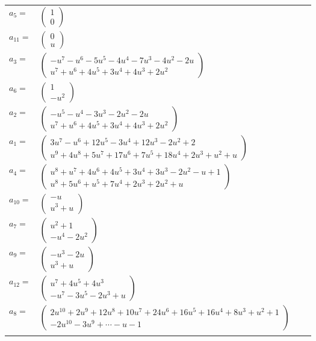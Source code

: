 \documentclass[1p]{elsarticle_modified}
\theoremstyle{definition}
\begin{document}
\begin{tabular}{m{7pt} m{180pt} m{7pt} m{180pt} }
\flushright $a_{5}=$&$\begin{pmatrix}1\\0\end{pmatrix}$ \\
\flushright $a_{11}=$&$\begin{pmatrix}0\\u\end{pmatrix}$ \\
\flushright $a_{3}=$&$\begin{pmatrix}- u^7- u^6-5 u^5-4 u^4-7 u^3-4 u^2-2 u\\u^7+u^6+4 u^5+3 u^4+4 u^3+2 u^2\end{pmatrix}$ \\
\flushright $a_{6}=$&$\begin{pmatrix}1\\- u^2\end{pmatrix}$ \\
\flushright $a_{2}=$&$\begin{pmatrix}- u^5- u^4-3 u^3-2 u^2-2 u\\u^7+u^6+4 u^5+3 u^4+4 u^3+2 u^2\end{pmatrix}$ \\
\flushright $a_{1}=$&$\begin{pmatrix}3 u^7- u^6+12 u^5-3 u^4+12 u^3-2 u^2+2\\u^9+4 u^8+5 u^7+17 u^6+7 u^5+18 u^4+2 u^3+u^2+u\end{pmatrix}$ \\
\flushright $a_{4}=$&$\begin{pmatrix}u^8+u^7+4 u^6+4 u^5+3 u^4+3 u^3-2 u^2- u+1\\u^8+5 u^6+u^5+7 u^4+2 u^3+2 u^2+u\end{pmatrix}$ \\
\flushright $a_{10}=$&$\begin{pmatrix}- u\\u^3+u\end{pmatrix}$ \\
\flushright $a_{7}=$&$\begin{pmatrix}u^2+1\\- u^4-2 u^2\end{pmatrix}$ \\
\flushright $a_{9}=$&$\begin{pmatrix}- u^3-2 u\\u^3+u\end{pmatrix}$ \\
\flushright $a_{12}=$&$\begin{pmatrix}u^7+4 u^5+4 u^3\\- u^7-3 u^5-2 u^3+u\end{pmatrix}$ \\
\flushright $a_{8}=$&$\begin{pmatrix}2 u^{10}+2 u^9+12 u^8+10 u^7+24 u^6+16 u^5+16 u^4+8 u^3+u^2+1\\-2 u^{10}-3 u^9+\cdots- u-1\end{pmatrix}$\\&\end{tabular}
\end{document}
